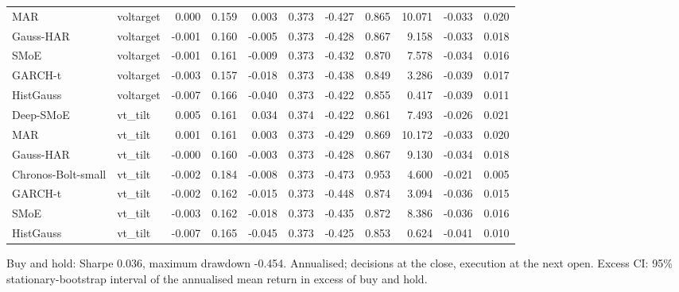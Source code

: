 \begin{table}[!htbp]
\begin{adjustbox}{max width=\textwidth}
\begin{tabular}{llrrrrrrrrr}
MAR & voltarget & 0.000 & 0.159 & 0.003 & 0.373 & -0.427 & 0.865 & 10.071 & -0.033 & 0.020\\
Gauss-HAR & voltarget & -0.001 & 0.160 & -0.005 & 0.373 & -0.428 & 0.867 & 9.158 & -0.033 & 0.018\\
SMoE & voltarget & -0.001 & 0.161 & -0.009 & 0.373 & -0.432 & 0.870 & 7.578 & -0.034 & 0.016\\
GARCH-t & voltarget & -0.003 & 0.157 & -0.018 & 0.373 & -0.438 & 0.849 & 3.286 & -0.039 & 0.017\\
HistGauss & voltarget & -0.007 & 0.166 & -0.040 & 0.373 & -0.422 & 0.855 & 0.417 & -0.039 & 0.011\\
Deep-SMoE & vt\_tilt & 0.005 & 0.161 & 0.034 & 0.374 & -0.422 & 0.861 & 7.493 & -0.026 & 0.021\\
MAR & vt\_tilt & 0.001 & 0.161 & 0.003 & 0.373 & -0.429 & 0.869 & 10.172 & -0.033 & 0.020\\
Gauss-HAR & vt\_tilt & -0.000 & 0.160 & -0.003 & 0.373 & -0.428 & 0.867 & 9.130 & -0.034 & 0.018\\
Chronos-Bolt-small & vt\_tilt & -0.002 & 0.184 & -0.008 & 0.373 & -0.473 & 0.953 & 4.600 & -0.021 & 0.005\\
GARCH-t & vt\_tilt & -0.002 & 0.162 & -0.015 & 0.373 & -0.448 & 0.874 & 3.094 & -0.036 & 0.015\\
SMoE & vt\_tilt & -0.003 & 0.162 & -0.018 & 0.373 & -0.435 & 0.872 & 8.386 & -0.036 & 0.016\\
HistGauss & vt\_tilt & -0.007 & 0.165 & -0.045 & 0.373 & -0.425 & 0.853 & 0.624 & -0.041 & 0.010\\
\bottomrule
\end{tabular}
\end{adjustbox}
\par\smallskip\begin{minipage}{\textwidth}\footnotesize
Buy and hold: Sharpe 0.036, maximum drawdown -0.454. Annualised; decisions at the close, execution at the next open. Excess CI: 95\% stationary-bootstrap interval of the annualised mean return in excess of buy and hold.
\end{minipage}
\end{table}